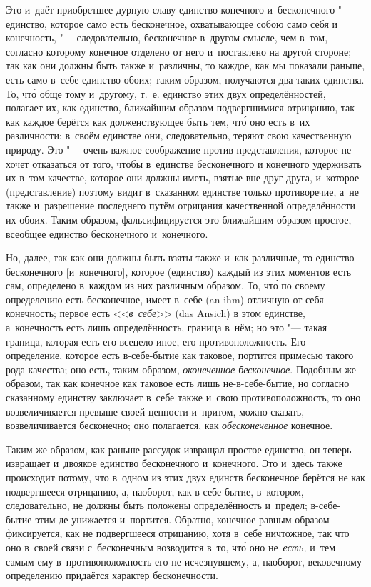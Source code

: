 Это и~даёт приобретшее дурную славу единство конечного и~бесконечного
"--- единство, которое само есть бесконечное, охватывающее собою само себя и
конечность, "--- следовательно, бесконечное в~другом смысле, чем в~том,
согласно которому конечное отделено от него и~поставлено на другой стороне;
так как они должны быть также и~различны, то каждое, как мы показали
раньше, есть само в~себе единство обоих; таким образом, получаются два
таких единства. То, чт\'{о} обще тому и~другому, т.~е. единство этих двух
определённостей, полагает их, как единство, ближайшим образом подвергшимися
отрицанию, так как каждое берётся как долженствующее быть тем, чт\'{о} оно есть
в~их различности; в~своём единстве они, следовательно, теряют свою
качественную природу. Это "--- очень важное соображение против представления,
которое не хочет отказаться от того, чтобы в~единстве бесконечного и
конечного удерживать их в~том качестве, которое они должны иметь, взятые
вне друг друга, и~которое (представление) поэтому видит в~сказанном
единстве только противоречие, а~не также и~разрешение последнего путём
отрицания качественной определённости их обоих. Таким образом,
фальсифицируется это ближайшим образом простое, всеобщее единство
бесконечного и~конечного.

Но, далее, так как они должны быть взяты также и~как различные, то единство
бесконечного [и~конечного], которое (единство) каждый из этих моментов есть
сам, определено в~каждом из них различным образом. То, чт\'{о} по своему
определению есть бесконечное, имеет в~себе (an ihm) отличную от себя
конечность; первое есть <<{\em в~себе}>> (das Ansich) в
этом единстве, а~конечность есть лишь определённость, граница в~нём; но это
"--- такая граница, которая есть его всецело иное, его
противоположность. Его определение, которое есть в-себе-бытие как таковое,
портится примесью такого рода качества; оно есть, таким образом,
{\em оконеченное бесконечное}. Подобным же образом, так
как конечное как таковое есть лишь не-в-себе-бытие, но согласно сказанному
единству заключает в~себе также и~свою противоположность, то оно
возвеличивается превыше своей ценности и~притом, можно сказать,
возвеличивается бесконечно; оно полагается, как
{\em обесконеченное} конечное.

Таким же образом, как раньше рассудок извращал простое единство, он
теперь извращает и~двоякое единство бесконечного и~конечного.
Это и~здесь также происходит потому, что в~одном из этих двух единств
бесконечное берётся не как подвергшееся отрицанию, а, наоборот, как
в-себе-бытие, в~котором, следовательно, не должны быть положены
определённость и~предел; в-себе-бытие этим-де унижается и~портится.
Обратно, конечное равным образом фиксируется, как не подвергшееся
отрицанию, хотя в~себе ничтожное, так что оно в~своей связи с~бесконечным
возводится в~то, чт\'{о} оно не~{\em есть,} и~тем самым ему
в~противоположность его не исчезнувшему, а, наоборот, вековечному
определению придаётся характер бесконечности.

